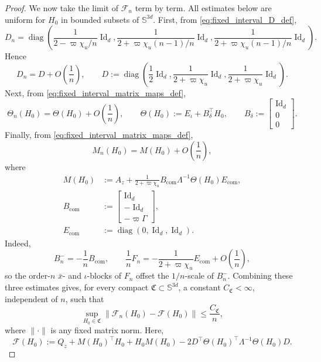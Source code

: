 \documentclass[12pt]{article}
\numberwithin{equation}{section}
\theoremstyle{definition}
\begin{document}
\begin{proof}
We now take the limit of \(\mathscr F_n\) term by term. All estimates below are uniform
for \(H_0\) in bounded subsets of \(\mathbb S^{3d}\). First, from
\eqref{eq:fixed_interval_D_def},
\[
D_n
=
\operatorname{diag}
\left(
\frac1{2-\varpi\chi_u/n}\operatorname{Id}_d,
\frac1{2+\varpi\chi_u(n-1)/n}\operatorname{Id}_d,
\frac1{2+\varpi\chi_u(n-1)/n}\operatorname{Id}_d
\right).
\]
Hence
\[
D_n
=
D+O\!\left(\frac1n\right),
\qquad
D:=
\operatorname{diag}
\left(\frac12\operatorname{Id}_d,\frac{1}{2+\varpi\chi_u}\operatorname{Id}_d,
\frac{1}{2+\varpi\chi_u}\operatorname{Id}_d\right).
\]
Next, from \eqref{eq:fixed_interval_matrix_maps_def},
\[
\Theta_n(H_0)
=
\Theta(H_0)+O\!\left(\frac1n\right),
\qquad
\Theta(H_0):=E_\iota+B_\delta^\top H_0,
\qquad
B_\delta:=
\begin{bmatrix}
\operatorname{Id}_d\\0\\0
\end{bmatrix}.
\]
Finally, from \eqref{eq:fixed_interval_matrix_maps_def},
\[
M_n(H_0)
=
M(H_0)+O\!\left(\frac1n\right),
\]
where
\[
\begin{aligned}
M(H_0)&:=
A_z+\frac{1}{2+\varpi\chi_u} B_{\mathrm{com}}\Lambda^{-1}\Theta(H_0)E_{\mathrm{com}},
\\
B_{\mathrm{com}}&:=
\begin{bmatrix}
\operatorname{Id}_d\\-\operatorname{Id}_d\\-\varpi\Gamma
\end{bmatrix},
\\
E_{\mathrm{com}}&:=
\operatorname{diag}(0,\operatorname{Id}_d,\operatorname{Id}_d).
\end{aligned}
\]
Indeed,
\[
B_n^{-}=-\frac1n B_{\mathrm{com}},
\qquad
\frac1n F_n
=
-\frac{1}{2+\varpi\chi_u} E_{\mathrm{com}}+O\!\left(\frac1n\right),
\]
so the order-\(n\) \(\bar x\)- and \(\iota\)-blocks of \(F_n\) offset the
\(1/n\)-scale of \(B_n^{-}\).
Combining these three estimates gives, for every compact
\(\mathfrak C\subset\mathbb S^{3d}\), a constant
\(C_{\mathfrak C}<\infty\), independent of \(n\), such that
\begin{equation}\label{eq:finite_riccati_vector_field_convergence}
\sup_{H_0\in\mathfrak C}
\|\mathscr F_n(H_0)-\mathscr F(H_0)\|
\le
\frac{C_{\mathfrak C}}{n},
\end{equation}
where \(\|\cdot\|\) is any fixed matrix norm.
Here,
\[
\mathscr F(H_0)
:=
Q_z
+M(H_0)^\top H_0
+H_0 M(H_0)
-2D^\top
\Theta(H_0)^\top\Lambda^{-1}
\Theta(H_0)D.
\]


\end{proof}
\end{document}
